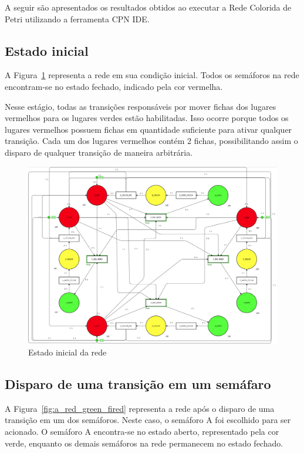 A seguir são apresentados os resultados obtidos ao executar a Rede Colorida de Petri utilizando a ferramenta CPN IDE.

\subsection{Estado inicial}

A Figura~\ref{fig:initial_state} representa a rede em sua condição inicial.
Todos os semáforos na rede encontram-se no estado fechado, indicado pela cor vermelha.

Nesse estágio, todas as transições responsáveis por mover fichas dos lugares vermelhos para os lugares verdes estão habilitadas.
Isso ocorre porque todos os lugares vermelhos possuem fichas em quantidade suficiente para ativar qualquer transição.
Cada um dos lugares vermelhos contém 2 fichas, possibilitando assim o disparo de qualquer transição de maneira arbitrária.

\begin{figure}[ht]
	\centering
	\includegraphics[width=1\textwidth]{images/initial_state.png}
	\caption{Estado inicial da rede}
    \label{fig:initial_state}
\end{figure}

\subsection{Disparo de uma transição em um semáfaro}

A Figura~\ref{fig:a_red_green_fired} representa a rede após o disparo de uma transição em um dos semáforos.
Neste caso, o semáforo A foi escolhido para ser acionado.
O semáforo A encontra-se no estado aberto, representado pela cor verde, enquanto os demais semáforos na rede permanecem no estado fechado.

